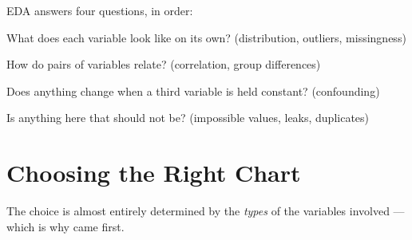 EDA answers four questions, in order:
\begin{tightnum}
  \item What does each variable look like on its own? (distribution, outliers, missingness)
  \item How do pairs of variables relate? (correlation, group differences)
  \item Does anything change when a third variable is held constant? (confounding)
  \item Is anything here that should not be? (impossible values, leaks, duplicates)
\end{tightnum}

\section{Choosing the Right Chart}

The choice is almost entirely determined by the \emph{types} of the variables
involved --- which is why  came first.

